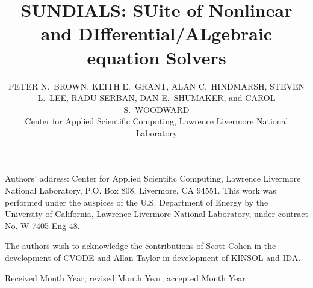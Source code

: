 \documentclass[acmtoms]{acmtrans2m}
\title{SUNDIALS: SUite of Nonlinear and DIfferential/ALgebraic equation Solvers}
\author{PETER N.~BROWN, KEITH E.~GRANT, ALAN C.~HINDMARSH, 
  STEVEN L.~LEE, RADU SERBAN, DAN E.~SHUMAKER, and CAROL S.~WOODWARD \\
  Center for Applied Scientific Computing,
  Lawrence Livermore National Laboratory}
\begin{document}
\setcounter{page}{1}

\begin{bottomstuff}
Authors' address: Center for Applied Scientific Computing, 
Lawrence Livermore National Laboratory, P.O. Box 808,
Livermore, CA 94551.\newline
This work was performed under the auspices of the
U.S. Department of Energy by the University of California,
Lawrence Livermore National Laboratory, under contract No.
W-7405-Eng-48.
\end{bottomstuff}

\maketitle




   
   
   








\begin{acks}
The authors wish to acknowledge the contributions of Scott Cohen
in the development of CVODE and Allan Taylor in development of
KINSOL and IDA.  

\end{acks}





\begin{received}
Received Month Year;
revised Month Year; accepted Month Year
\end{received}
\end{document}
